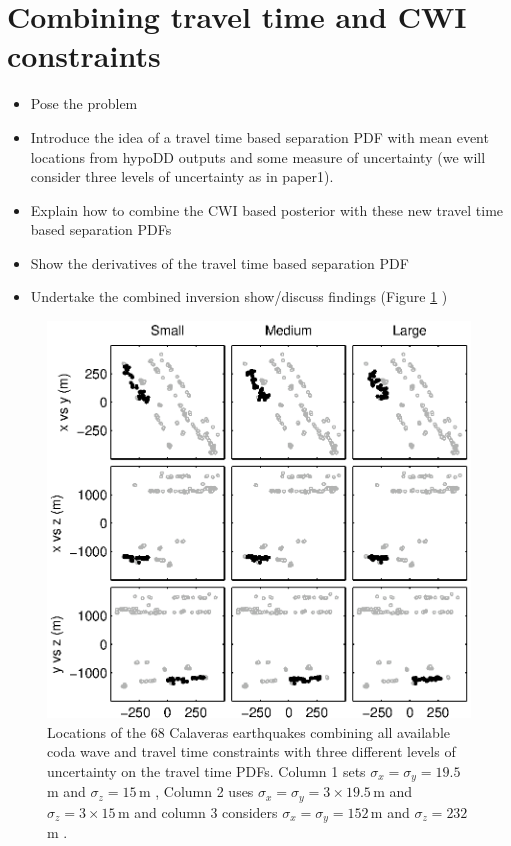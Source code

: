 \documentclass[extra]{gji}
\begin{document}
\section{Combining travel time and CWI constraints}
\label{sec:CalaverasLoc-CWIandTT}
\begin{itemize}
\item Pose the problem
\item Introduce the idea of a travel time based separation PDF with mean event locations from hypoDD outputs and
some measure of uncertainty (we will consider three levels of uncertainty as in paper1).
\item Explain how to combine the CWI based posterior with these new travel time based separation PDFs
\item Show the derivatives of the travel time based separation PDF
\item Undertake the combined inversion show/discuss findings (Figure \ref{fig-68Calaverasevents_ttandcoda1} )
\end{itemize}

\begin{figure}
\noindent\includegraphics{diags/CalaverasLoc5.eps}
\caption{Locations of the 68 Calaveras earthquakes combining all available coda wave and travel time constraints with three different
levels of uncertainty on the travel time PDFs. Column 1 sets $\sigma_x = \sigma_y = 19.5$\,m and $\sigma_z = 15$\,m
\citep[after]{dr_Waldhauser08a}, Column 2 uses $\sigma_x = \sigma_y = 3 \times19.5$\,m and $\sigma_z = 3\times15$\,m and
column 3 considers $\sigma_x = \sigma_y = 152$\,m and $\sigma_z = 232$\,m \citep[after]{dr_Shearer97a}. }
\label{fig-68Calaverasevents_ttandcoda1}
\end{figure}
\end{document}
